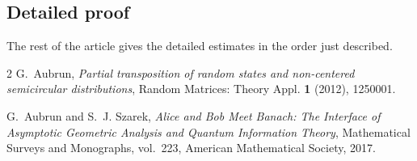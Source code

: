 \documentclass[11pt,reqno]{amsart}
\newenvironment{revderived}{\begingroup\color{RevisionDerived}}{\endgroup}
\begin{document}
\begin{revderived}
\subsection{Detailed proof}

The rest of the article gives the detailed estimates in the order just
described.
\end{revderived}

\appendix


\begin{thebibliography}{2}
G.~Aubrun,
\emph{Partial transposition of random states and non-centered semicircular
distributions},
Random Matrices: Theory Appl. \textbf{1} (2012), 1250001.

G.~Aubrun and S.~J. Szarek,
\emph{Alice and Bob Meet Banach: The Interface of Asymptotic Geometric
Analysis and Quantum Information Theory},
Mathematical Surveys and Monographs, vol.~223, American Mathematical
Society, 2017.
\end{thebibliography}
\end{document}
